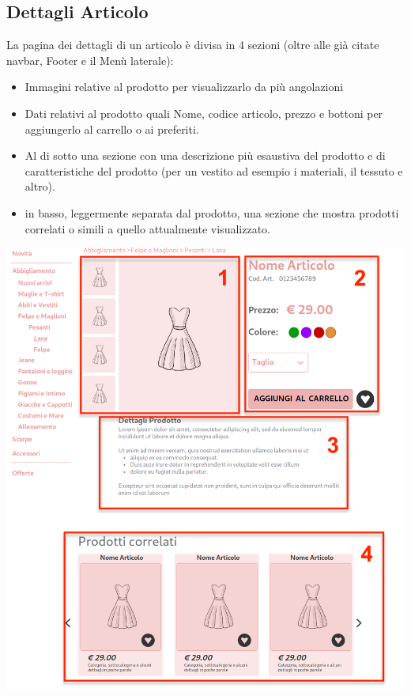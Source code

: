 \documentclass[12pt,a4paper]{report}
\begin{document}
\subsection{Dettagli Articolo}
La pagina dei dettagli di un articolo è divisa in 4 sezioni (oltre alle già citate navbar, Footer e il Menù laterale):
\begin{itemize}
  \item Immagini relative al prodotto per visualizzarlo da più angolazioni
  \item Dati relativi al prodotto quali Nome, codice articolo, prezzo e bottoni per aggiungerlo al carrello o ai preferiti.
  \item Al di sotto una sezione con una descrizione più esaustiva del prodotto e di caratteristiche del prodotto (per un vestito ad esempio i materiali, il tessuto e altro).
  \item in basso, leggermente separata dal prodotto, una sezione che mostra prodotti correlati o simili a quello attualmente visualizzato.
\end{itemize}
\begin{center}
\includegraphics[height=0.9\textheight]{"Images Latex/Immagini Wireframe/Desktop/7 - Dettagli Prodotto (1)"}
\end{center}
\newpage
\end{document}
